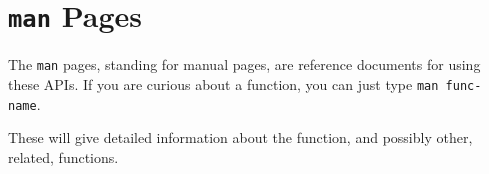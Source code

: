 \section{\texttt{man} Pages}\label{sec:Man_Pages}
The \texttt{man} pages, standing for manual pages, are reference documents for using these APIs.
If you are curious about a function, you can just type \texttt{man func-name}.

These will give detailed information about the function, and possibly other, related, functions.


